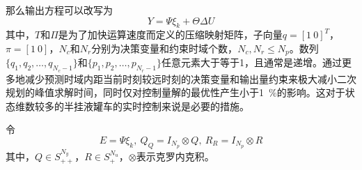             那么输出方程可以改写为
            \begin{equation}
            Y = \Psi \xi_k + \Theta \Delta U
            \end{equation}
            \noindent 其中，$T$和$\Pi$是为了加快运算速度而定义的压缩映射矩阵，子向量$q = [1\ 0]^T$，$\pi = [1\ 0]$，$N_c$和$N_r$分别为决策变量和约束时域个数，$N_c, N_r \leq N_p$。数列$\{q_1, q_2, \dots, q_{N_c - 1}\}$和$\{p_1, p_2, \dots, p_{N_r - 1}\}$任意元素大于等于1，且通常是递增。通过更多地减少预测时域内距当前时刻较远时刻的决策变量和输出量约束来极大减小二次规划的峰值求解时间，同时仅对控制量解的最优性产生小于\SI{1}{\percent}的影响\cite{shengbo2015fastmpc}。这对于状态维数较多的半挂液罐车的实时控制来说是必要的措施。

            令
            \begin{equation}
            E = \Psi \xi_k,\ Q_Q = I_{N_p} \otimes Q,\ R_R = I_{N_p} \otimes R
            \end{equation}
            \noindent 其中，$Q \in S_{++}^{N_y}$，$R \in S_+^{N_u}$，$\otimes$表示克罗内克积。

